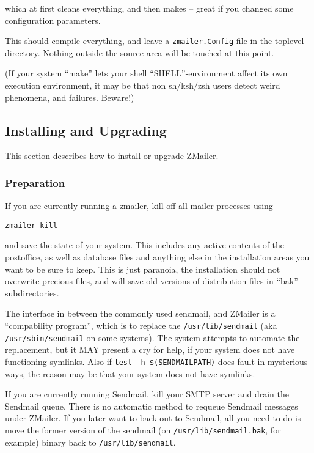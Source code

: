 which at first cleans everything, and then makes -- great if you
changed some configuration parameters.

This should compile everything, and leave a {\tt zmailer.Config} file in
the toplevel directory.  Nothing outside the source area will be
touched at this point.

(If your system ``make'' lets your shell ``SHELL''-environment
affect its own execution environment, it may be that non sh/ksh/zsh
users detect weird phenomena, and failures. Beware!)




\subsection{Installing and Upgrading}

This section describes how to install or upgrade ZMailer.




\subsubsection{Preparation}

If you are currently running a zmailer, kill off all mailer processes
using
\begin{tscreen}
\begin{verbatim}
zmailer kill
\end{verbatim}
\end{tscreen}

and save the state of your system.  This includes any active
contents of the postoffice, as well as database files and
anything else in the installation areas you want to be sure
to keep.  This is just paranoia, the installation should not
overwrite precious files, and will save old versions of
distribution files in ``bak'' subdirectories.

The interface in between the commonly used sendmail, and ZMailer
is a ``compability program'', which is to replace the {\tt /usr/lib/sendmail}
(aka {\tt /usr/sbin/sendmail} on some systems).
The system attempts to automate the replacement, but it MAY present
a cry for help, if your system does not have functioning symlinks.
Also if {\tt test -h \$(SENDMAILPATH)} does fault in mysterious ways,
the reason may be that your system does not have symlinks.

If you are currently running Sendmail, kill your SMTP server
and drain the Sendmail queue.  There is no automatic method
to requeue Sendmail messages under ZMailer.  If you later want
to back out to Sendmail, all you need to do is move the former
version of the sendmail (on {\tt /usr/lib/sendmail.bak}, for example)
binary back to {\tt /usr/lib/sendmail}.

